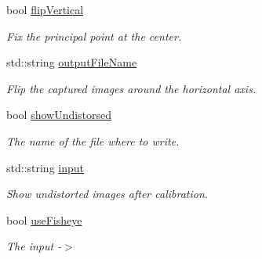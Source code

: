 \begin{DoxyCompactItemize}
\mbox{\label{class_image_processing_1_1_settings_a484283e00b41f90e084d6fb42e96780f}} 
bool \mbox{\hyperlink{class_image_processing_1_1_settings_a484283e00b41f90e084d6fb42e96780f}{flip\+Vertical}}
\begin{DoxyCompactList}\small\item\em Fix the principal point at the center. \end{DoxyCompactList}\item 
\mbox{\label{class_image_processing_1_1_settings_a8c2a51c40957f7164e3094ab4f9304db}} 
std\+::string \mbox{\hyperlink{class_image_processing_1_1_settings_a8c2a51c40957f7164e3094ab4f9304db}{output\+File\+Name}}
\begin{DoxyCompactList}\small\item\em Flip the captured images around the horizontal axis. \end{DoxyCompactList}\item 
\mbox{\label{class_image_processing_1_1_settings_af614d8c9e03229a715aabe03baee3008}} 
bool \mbox{\hyperlink{class_image_processing_1_1_settings_af614d8c9e03229a715aabe03baee3008}{show\+Undistorsed}}
\begin{DoxyCompactList}\small\item\em The name of the file where to write. \end{DoxyCompactList}\item 
\mbox{\label{class_image_processing_1_1_settings_ad1212876e0e534640f0096a132930a19}} 
std\+::string \mbox{\hyperlink{class_image_processing_1_1_settings_ad1212876e0e534640f0096a132930a19}{input}}
\begin{DoxyCompactList}\small\item\em Show undistorted images after calibration. \end{DoxyCompactList}\item 
\mbox{\label{class_image_processing_1_1_settings_a6f0c203a97c20e1d9c4f29283f4da453}} 
bool \mbox{\hyperlink{class_image_processing_1_1_settings_a6f0c203a97c20e1d9c4f29283f4da453}{use\+Fisheye}}
\begin{DoxyCompactList}\small\item\em The input -\/$>$ \end{DoxyCompactList}\item 

\end{DoxyCompactItemize}
